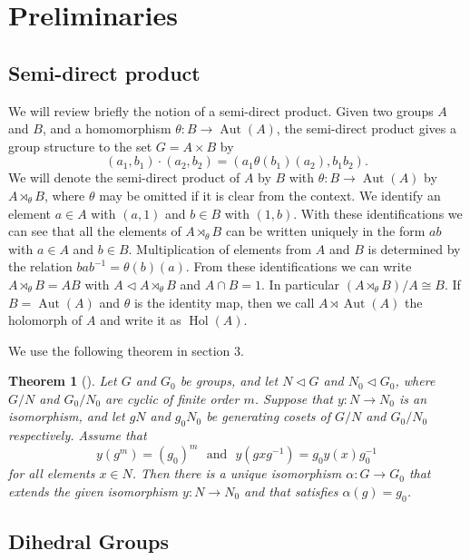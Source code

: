 \documentclass{amsart}
\newtheorem{thm}{Theorem}[section]
\begin{document}
\section{Preliminaries}

\subsection{Semi-direct product}
We will review briefly the notion of a semi-direct product.
Given two groups $A$ and $B$, and a homomorphism $\theta : B \to \operatorname{Aut}(A)$,
the semi-direct product gives a group structure to the set $G = A \times B$ by
\[ (a_1, b_1) \cdot (a_2 , b_2) =(a_1 \theta(b_1)(a_2), b_1 b_2).\]
We will denote the semi-direct product of $A$ by $B$ with $\theta : B \to \operatorname{Aut}(A)$ by 
$A \rtimes_\theta B$,
where $\theta$ may be omitted if it is clear from the context.
We identify an element $a \in A$ with $(a,1)$ and $b \in B$ with $(1,b)$.
With these identifications we can see that all the elements of $A \rtimes_\theta B$ can be written uniquely in the form $ab$ with $a \in A$ and $b \in B$.
Multiplication of elements from $A$ and $B$ is determined by the relation $bab^{-1}=\theta(b)(a)$.
From these identifications we can write $A \rtimes_\theta B=AB$ with $A \triangleleft A \rtimes_\theta B$ and $A \cap B =1$.
In particular $(A \rtimes_\theta B)/A \cong B$.
If $B= \operatorname{Aut}(A)$ and $\theta$ is the identity map, then we call $A\rtimes \operatorname{Aut}(A)$ the holomorph of $A$ and write it as $\operatorname{Hol}(A)$.

We use the following theorem in section 3.
\begin{thm}[{\cite[Theorem 3.35]{Isaacs}}]\label{Is335}
Let $G$ and $G_0$ be groups, 
and let $N \triangleleft G$ and $N_0 \triangleleft G_0$,
where $G/N$ and $G_0/N_0$ are cyclic of finite order $m$.
Suppose that $y : N \to N_0$ is an isomorphism,
and let $gN$ and $g_0N_0$ be generating cosets of $G/N$ and $G_0 / N_0$ respectively.
Assume that
\[ y(g^m) = (g_0)^m \ \ \ \textrm{and} \ \ \ y(gxg^{-1}) = g_0y(x)g_0^{-1}\]
for all elements $x \in N$.
Then there is a unique isomorphism $\alpha : G \to G_0$ that extends the given isomorphism $y:N \to N_0$ and that satisfies $\alpha(g)=g_0$.
\end{thm}

\subsection{Dihedral Groups}
\end{document}
